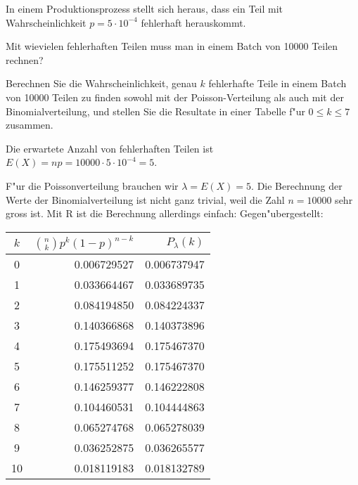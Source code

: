 In einem Produktionsprozess stellt sich heraus, dass ein Teil mit Wahrscheinlichkeit
$p=5\cdot10^{-4}$ fehlerhaft herauskommt.
\begin{teilaufgaben}
\item Mit wievielen fehlerhaften Teilen muss man in einem Batch von 10000 Teilen
rechnen?
\item Berechnen Sie die Wahrscheinlichkeit, genau $k$ fehlerhafte Teile in einem
Batch von 10000 Teilen zu finden sowohl mit der Poisson-Verteilung als auch
mit der Binomialverteilung, und stellen Sie die Resultate in einer Tabelle
f"ur $0\le k\le 7$
zusammen.
\end{teilaufgaben}

\begin{loesung}
\begin{teilaufgaben}
\item Die erwartete Anzahl von fehlerhaften Teilen ist
$E(X)=np=10000\cdot 5\cdot10^{-4}=5$.
\item F"ur die Poissonverteilung brauchen wir $\lambda=E(X)=5$.
Die Berechnung der Werte der Binomialverteilung ist nicht ganz trivial, weil
die Zahl $n=10000$ sehr gross ist.
Mit R ist die Berechnung allerdings einfach:
Gegen"ubergestellt:
\begin{center}
\begin{tabular}{c|rr}
$k$&$\binom{n}{k}p^k(1-p)^{n-k}$&$P_\lambda(k)$\\
\hline
 0&0.006729527& 0.006737947\\
 1&0.033664467& 0.033689735\\
 2&0.084194850& 0.084224337\\
 3&0.140366868& 0.140373896\\
 4&0.175493694& 0.175467370\\
 5&0.175511252& 0.175467370\\
 6&0.146259377& 0.146222808\\
 7&0.104460531& 0.104444863\\
 8&0.065274768& 0.065278039\\
 9&0.036252875& 0.036265577\\
10&0.018119183& 0.018132789\\
\hline
\end{tabular}
\end{center}
\end{teilaufgaben}
\end{loesung}

